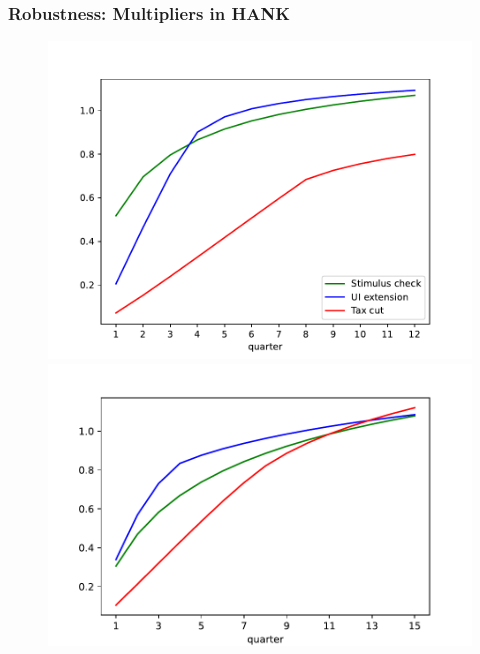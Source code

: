 \documentclass[pdflatex,aspectratio=169]{beamer}
\begin{document}
\begin{frame}
\frametitle{Robustness: Multipliers in HANK}

\begin{figure}
\begin{minipage}[c]{0.48\linewidth}
\includegraphics[scale=0.5]{Code/HA-Models/FromPandemicCode/Figures/Cummulative_multipliers}
\vspace{0.2cm}
\end{minipage}
\hfill
\begin{minipage}[c]{0.48\linewidth}
\includegraphics[scale= 0.5]{Code/HA-Models/FromPandemicCode/Figures/Cumulative_multipliers_HANK}
\vspace{0.2cm}
\end{minipage}
\end{figure}

\end{frame}
\end{document}
